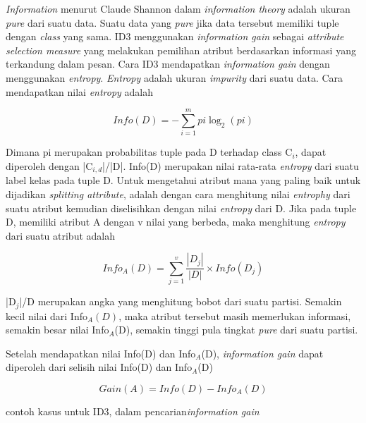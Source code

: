 \textsl{Information} menurut Claude Shannon dalam \textsl{information theory} adalah ukuran \textsl{pure} dari suatu data. Suatu data yang \textsl{pure} jika data tersebut memiliki tuple dengan \textsl{class} yang sama. ID3 menggunakan \textsl{information gain} sebagai \textsl{attribute selection measure} yang melakukan pemilihan atribut berdasarkan informasi yang terkandung dalam pesan. Cara ID3 mendapatkan \textsl{information gain} dengan menggunakan \textsl{entropy}. \textsl{Entropy} adalah ukuran \textsl{impurity} dari suatu data. Cara mendapatkan nilai \textsl{entropy} adalah

\begin{displaymath}
	Info(D) = -\sum_{i=1}^{m} pi \log_2(pi)
\end{displaymath}

Dimana pi merupakan probabilitas tuple pada D terhadap class C$_{i}$, dapat diperoleh dengan |C$_{i,d}$|/|D|. Info(D) merupakan nilai rata-rata \textsl{entropy} dari suatu label kelas pada tuple D. Untuk mengetahui atribut mana yang paling baik untuk dijadikan \textsl{splitting attribute}, adalah dengan cara menghitung nilai \textsl{entrophy} dari suatu atribut kemudian diselisihkan dengan nilai \textsl{entropy} dari D. Jika pada tuple D, memiliki atribut A dengan v nilai yang berbeda, maka menghitung \textsl{entropy} dari suatu atribut adalah

\begin{displaymath}
	Info_A(D) = \sum_{j=1}^v \frac{|D_j|}{|D|} \times Info(D_j)
\end{displaymath}

|D$_{j}$|/D merupakan angka yang menghitung bobot dari suatu partisi. Semakin kecil nilai dari Info$_{A}(D)$, maka atribut tersebut masih memerlukan informasi, semakin besar nilai Info$_{A}$(D), semakin tinggi pula tingkat \textsl{pure} dari suatu partisi.

Setelah mendapatkan nilai Info(D) dan Info$_{A}$(D), \textsl{information gain} dapat diperoleh dari selisih nilai Info(D) dan Info$_{A}$(D)

\begin{displaymath}
	Gain(A) = Info(D) - Info_A(D)
\end{displaymath}

contoh kasus untuk ID3, dalam pencarian\textsl{information gain}

